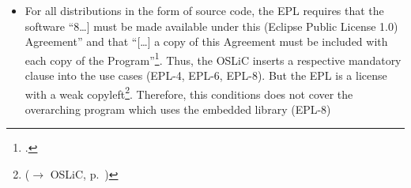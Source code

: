\begin{itemize}
  \item For all distributions in the form of source code, the EPL requires that
  the software \enquote{8\ldots] must be made available under this (Eclipse
  Public License 1.0) Agreement} and that \enquote{[\ldots] a copy of this
  Agreement must be included with each copy of the
  Program}\footcite[cf.][\nopage wp\ §3]{Epl10OsiLicense2005a}. Thus, the OSLiC
  inserts a respective mandatory clause into the use cases (EPL-4, EPL-6,
  EPL-8). But the EPL is a license with a weak copyleft\footnote{($\rightarrow$
  OSLiC, p.\ \pageref{sec:ProtectingPowerOfEpl})}. Therefore, this conditions
  does not cover the overarching program which uses the embedded library (EPL-8)
  


  

\end{itemize}








%
